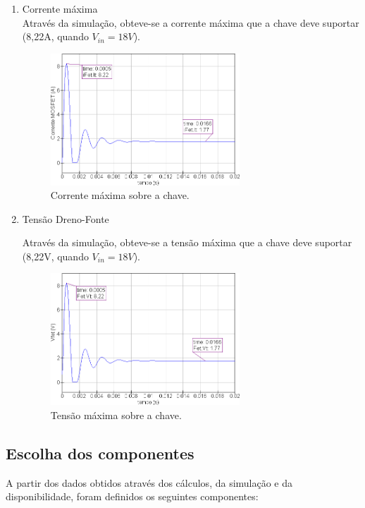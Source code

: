 \documentclass[a4paper]{article}
\begin{document}
{\begin{enumerate}
\begin{enumerate}
\FloatBarrier
\pagebreak
\item Corrente máxima \\
Através da simulação, obteve-se a corrente máxima que a chave deve suportar (8,22A, quando $V_{in} = 18V$).
\FloatBarrier
\begin{figure}[H]
	\centering
	\includegraphics[width=0.67\textwidth]{ifet_vinmax.png}
	\caption{Corrente máxima sobre a chave.}
	\label{fig:ifet_max}
\end{figure}
\FloatBarrier
\item Tensão Dreno-Fonte
\label{subitem:vds}

Através da simulação, obteve-se a tensão máxima que a chave deve suportar (8,22V, quando $V_{in} = 18V$).

\begin{figure}[H]
	\centering
	\includegraphics[width=0.67\textwidth]{vfet_vinmax.png}
	\caption{Tensão máxima sobre a chave.}
	\label{fig:vfet_max}
\end{figure}

\end{enumerate}

\end{enumerate}

\subsection*{Escolha dos componentes}
A partir dos dados obtidos através dos cálculos, da simulação e da disponibilidade, foram definidos os seguintes componentes:

}
\end{document}
